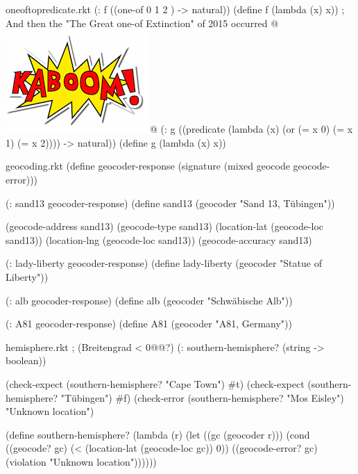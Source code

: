 \begin{filecontents*}{oneoftopredicate.rkt}
(: f ((one-of 0 1 2 ) -> natural))
(define f
  (lambda (x)
    x))
; And then the "The Great one-of Extinction" of 2015 occurred @\includegraphics[scale=0.5]{kaboon}@
(: g ((predicate 
       (lambda (x) (or (= x 0) (= x 1) (= x 2)))) -> natural))
(define g
  (lambda (x)
    x))
\end{filecontents*}
\begin{filecontents*}{geocoding.rkt}
(define geocoder-response
  (signature (mixed geocode geocode-error)))

(: sand13 geocoder-response)
(define sand13
  (geocoder "Sand 13, Tübingen"))

(geocode-address sand13)
(geocode-type sand13)
(location-lat (geocode-loc sand13))
(location-lng (geocode-loc sand13))
(geocode-accuracy sand13)
  

(: lady-liberty geocoder-response)
(define lady-liberty
  (geocoder "Statue of Liberty"))

(: alb geocoder-response)
(define alb
  (geocoder "Schwäbische Alb"))

(: A81 geocoder-response)
(define A81
  (geocoder "A81, Germany"))
\end{filecontents*}
\begin{filecontents*}{hemisphere.rkt}
; (Breitengrad < 0@\latexcode{$^{\circ}$}@?)
(: southern-hemisphere? (string -> boolean))

(check-expect (southern-hemisphere? "Cape Town") #t)
(check-expect (southern-hemisphere? "Tübingen") #f)
(check-error  (southern-hemisphere? "Mos Eisley") "Unknown location")

(define southern-hemisphere?
  (lambda (r)
    (let ((gc (geocoder r)))
      (cond ((geocode? gc)  
             (< (location-lat (geocode-loc gc)) 0))
            ((geocode-error? gc) 
             (violation "Unknown location"))))))
\end{filecontents*}
